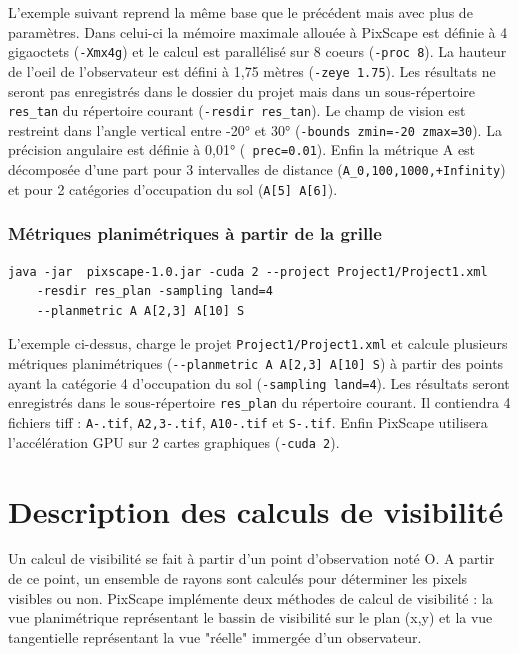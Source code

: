 \documentclass{report}
\begin{document}
L'exemple suivant reprend la même base que le précédent mais avec plus de paramètres. Dans celui-ci la mémoire maximale allouée à PixScape est définie à 4 gigaoctets (\verb|-Xmx4g|) et le calcul est parallélisé sur 8 coeurs (\verb|-proc 8|). La hauteur de l'oeil de l'observateur est défini à 1,75 mètres (\verb|-zeye 1.75|). Les résultats ne seront pas enregistrés dans le dossier du projet mais dans un sous-répertoire \verb|res_tan| du répertoire courant (\verb|-resdir res_tan|). Le champ de vision est restreint dans l'angle vertical entre -20° et 30° (\verb|-bounds zmin=-20 zmax=30|). La précision angulaire est définie à 0,01° (\verb| prec=0.01|). Enfin la métrique A est décomposée d'une part pour 3 intervalles de distance (\verb|A_0,100,1000,+Infinity|) et pour 2 catégories d'occupation du sol (\verb|A[5] A[6]|).

\subsection{Métriques planimétriques à partir de la grille}
\begin{Verbatim}
java -jar  pixscape-1.0.jar -cuda 2 --project Project1/Project1.xml
	-resdir res_plan -sampling land=4 
	--planmetric A A[2,3] A[10] S
\end{Verbatim}
L'exemple ci-dessus, charge le projet \verb|Project1/Project1.xml| et calcule plusieurs métriques planimétriques (\verb|--planmetric A A[2,3] A[10] S|) à partir des points ayant la catégorie 4 d'occupation du sol (\verb|-sampling land=4|). Les résultats seront enregistrés dans le sous-répertoire \verb|res_plan| du répertoire courant. Il contiendra 4 fichiers tiff : \verb|A-.tif|, \verb|A2,3-.tif|, \verb|A10-.tif| et \verb|S-.tif|. Enfin PixScape utilisera l'accélération GPU sur 2 cartes graphiques (\verb|-cuda 2|).


\chapter{Description des calculs de visibilité}
\label{principles}
Un calcul de visibilité se fait à partir d'un point d'observation noté O. A partir de ce point, un ensemble de rayons sont calculés pour déterminer les pixels visibles ou non. 
PixScape implémente deux méthodes de calcul de visibilité : la vue planimétrique représentant le bassin de visibilité sur le plan (x,y) et la vue tangentielle représentant la vue "réelle" immergée d'un observateur.
\end{document}
